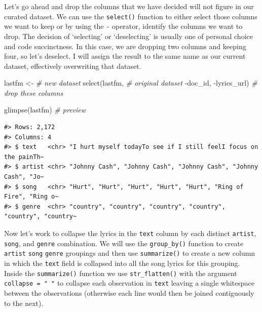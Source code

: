 \documentclass[
  letterpaper,
]{latex/krantz}
\newenvironment{Shaded}{\begin{snugshade}}{\end{snugshade}}
\newcommand{\CommentTok}[1]{\textcolor[rgb]{0.00,0.00,0.00}{\textit{#1}}}
\newcommand{\FunctionTok}[1]{\textcolor[rgb]{0.00,0.00,0.00}{#1}}
\newcommand{\NormalTok}[1]{\textcolor[rgb]{0.00,0.00,0.00}{#1}}
\newcommand{\OtherTok}[1]{\textcolor[rgb]{0.00,0.00,0.00}{#1}}
\newcommand{\SpecialCharTok}[1]{\textcolor[rgb]{0.00,0.00,0.00}{#1}}
\begin{document}
Let's go ahead and drop the columns that we have decided will not figure
in our curated dataset. We can use the \texttt{select()} function to
either select those columns we want to keep or by using the \texttt{-}
operator, identify the columns we want to drop. The decision of
`selecting' or `deselecting' is usually one of personal choice and code
succinctness. In this case, we are dropping two columns and keeping
four, so let's deselect. I will assign the result to the same name as
our current dataset, effectively overwriting that dataset.

\begin{Shaded}
\begin{Highlighting}[]
\NormalTok{lastfm }\OtherTok{\textless{}{-}} \CommentTok{\# new dataset}
  \FunctionTok{select}\NormalTok{(lastfm, }\CommentTok{\# original dataset}
         \SpecialCharTok{{-}}\NormalTok{doc\_id, }\SpecialCharTok{{-}}\NormalTok{lyrics\_url) }\CommentTok{\# drop these columns}

\FunctionTok{glimpse}\NormalTok{(lastfm) }\CommentTok{\# preview}
\end{Highlighting}
\end{Shaded}

\begin{verbatim}
#> Rows: 2,172
#> Columns: 4
#> $ text   <chr> "I hurt myself todayTo see if I still feelI focus on the painTh~
#> $ artist <chr> "Johnny Cash", "Johnny Cash", "Johnny Cash", "Johnny Cash", "Jo~
#> $ song   <chr> "Hurt", "Hurt", "Hurt", "Hurt", "Hurt", "Ring of Fire", "Ring o~
#> $ genre  <chr> "country", "country", "country", "country", "country", "country~
\end{verbatim}

Now let's work to collapse the lyrics in the \texttt{text} column by
each distinct \texttt{artist}, \texttt{song}, and \texttt{genre}
combination. We will use the \texttt{group\_by()} function to create
\texttt{artist} \texttt{song} \texttt{genre} groupings and then use
\texttt{summarize()} to create a new column in which the \texttt{text}
field is collapsed into all the song lyrics for this grouping. Inside
the \texttt{summarize()} function we use \texttt{str\_flatten()} with
the argument \texttt{collapse\ =\ "\ "} to collapse each observation in
\texttt{text} leaving a single whitespace between the observations
(otherwise each line would then be joined contiguously to the next).
\end{document}
